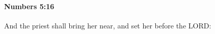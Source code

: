 
		\paragraph{Numbers 5:16} %
			\label{NUMBERS-5-16}

			And the priest shall bring her near, and set her before the LORD:


